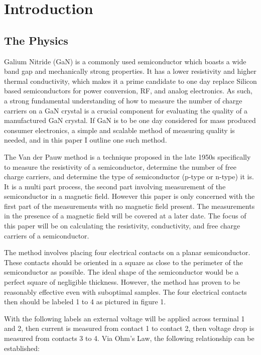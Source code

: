 \section{Introduction}
\subsection{The Physics}
	Galium Nitride (GaN) is a commonly used semiconductor which boasts a wide band gap and mechanically strong properties. It has a lower resistivity and higher thermal conductivity, which makes it a prime candidate to one day replace Silicon based semiconductors for power conversion, RF, and analog electronics. As such, a strong fundamental understanding of how to measure the number of charge carriers on a GaN crystal is a crucial component for evaluating the quality of a manufactured GaN crystal. If GaN is to be one day considered for mass produced consumer electronics, a simple and scalable method of measuring quality is needed, and in this paper I outline one such method.
	
	The Van der Pauw method is a technique proposed in the late 1950s specifically to measure the resistivity of a semiconductor, determine the number of free charge carriers, and determine the type of semiconductor (p-type or n-type) it is. It is a multi part process, the second part involving measurement of the semiconductor in a magnetic field. However this paper is only concerned with the first part of the measurements with no magnetic field present. The measurements in the presence of a magnetic field will be covered at a later date. The focus of this paper will be on calculating the resistivity, conductivity, and free charge carriers of a semiconductor.
	
	The method involves placing four electrical contacts on a planar semiconductor. These contacts should be oriented in a square as close to the perimeter of the semiconductor as possible. The ideal shape of the semiconductor would be a perfect square of negligible thickness. However, the method has proven to be reasonably effective even with suboptimal samples. The four electrical contacts then should be labeled 1 to 4 as pictured in figure 1.


With the following labels an external voltage will be applied across terminal 1 and 2, then current is measured from contact 1 to contact 2, then voltage drop is measured from contacts 3 to 4. Via Ohm’s Law, the following relationship can be established:

